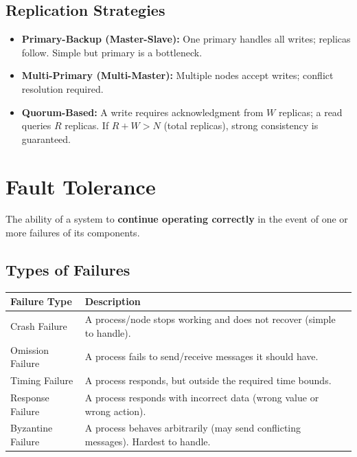 \documentclass[11pt,a4paper]{article}
\begin{document}
\subsection{Replication Strategies}
\begin{itemize}[leftmargin=*, itemsep=3pt]
  \item \textbf{Primary-Backup (Master-Slave):} One primary handles all writes; replicas follow. Simple but primary is a bottleneck.
  \item \textbf{Multi-Primary (Multi-Master):} Multiple nodes accept writes; conflict resolution required.
  \item \textbf{Quorum-Based:} A write requires acknowledgment from $W$ replicas; a read queries $R$ replicas. If $R + W > N$ (total replicas), strong consistency is guaranteed.
\end{itemize}

\section{Fault Tolerance}

\begin{definitionbox}
The ability of a system to \textbf{continue operating correctly} in the event of one or more failures of its components.
\end{definitionbox}

\subsection{Types of Failures}
\begin{longtable}{@{}p{3.5cm}p{9.8cm}@{}}
\toprule
\rowcolor{primary!15}
\textbf{Failure Type} & \textbf{Description} \\
\midrule
\endhead
Crash Failure & A process/node stops working and does not recover (simple to handle). \\
Omission Failure & A process fails to send/receive messages it should have. \\
Timing Failure & A process responds, but outside the required time bounds. \\
Response Failure & A process responds with incorrect data (wrong value or wrong action). \\
Byzantine Failure & A process behaves arbitrarily (may send conflicting messages). Hardest to handle. \\
\bottomrule
\end{longtable}
\end{document}
